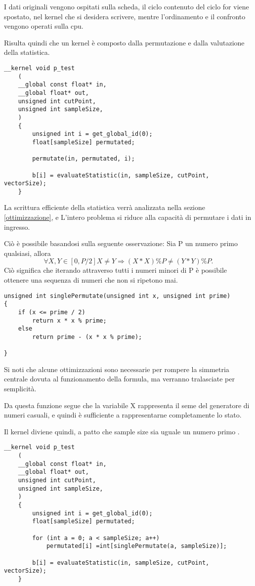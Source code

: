 I dati originali vengono ospitati sulla scheda, il ciclo contenuto del ciclo for viene spostato, nel kernel che si desidera scrivere, mentre l'ordinamento e il confronto vengono operati sulla cpu.


Risulta quindi che un kernel è composto dalla permutazione e dalla valutazione della statistica. 

\begin{lstlisting}[style=CStyle]
	__kernel void p_test
	(
	__global const float* in,
	__global float* out,
	unsigned int cutPoint,
	unsigned int sampleSize,
	)
	{
		unsigned int i = get_global_id(0);
		float[sampleSize] permutated;
		
		permutate(in, permutated, i);
		
		b[i] = evaluateStatistic(in, sampleSize, cutPoint, vectorSize);
	}
\end{lstlisting}

La scrittura efficiente della statistica verrà analizzata nella sezione \ref{ottimizzazione}, e
L'intero problema si riduce alla capacità di permutare i dati in ingresso.

Ciò è possibile basandosi sulla seguente osservazione:
Sia P un numero primo qualsiasi, allora $$ \forall X, Y  \in [0, P/ 2]  X \neq Y \Rightarrow (X * X) \% P \neq (Y * Y) \% P.$$
Ciò significa che iterando attraverso tutti i numeri minori di P è possibile ottenere una sequenza di numeri che non si ripetono mai.
 
\begin{lstlisting}[style=CStyle]
unsigned int singlePermutate(unsigned int x, unsigned int prime)
{	
	if (x <= prime / 2)
		return x * x % prime;
	else
		return prime - (x * x % prime);	

}
\end{lstlisting}

Si noti che alcune ottimizzazioni sono necessarie per rompere la simmetria centrale dovuta al funzionamento della formula, ma verranno tralasciate per semplicità.

Da questa funzione segue che la variabile X rappresenta il seme del generatore di numeri casuali, e quindi è sufficiente a rappresentarne completamente lo stato. 

Il kernel diviene quindi, a patto che sample size sia uguale un numero primo .
\begin{lstlisting}[style=CStyle]
	__kernel void p_test
	(
	__global const float* in,
	__global float* out,
	unsigned int cutPoint,
	unsigned int sampleSize,
	)
	{
		unsigned int i = get_global_id(0);
		float[sampleSize] permutated;
		
		for (int a = 0; a < sampleSize; a++)
			permutated[i] =int[singlePermutate(a, sampleSize)];
		
		b[i] = evaluateStatistic(in, sampleSize, cutPoint, vectorSize);
	}
\end{lstlisting}

